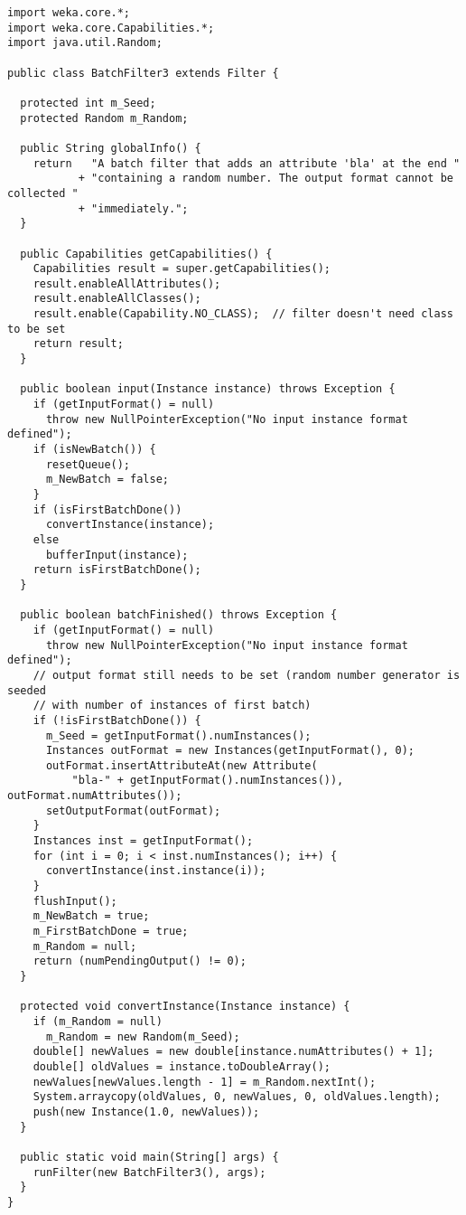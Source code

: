 
\begin{verbatim}
import weka.core.*;
import weka.core.Capabilities.*;
import java.util.Random;

public class BatchFilter3 extends Filter {

  protected int m_Seed;
  protected Random m_Random;

  public String globalInfo() {
    return   "A batch filter that adds an attribute 'bla' at the end "
           + "containing a random number. The output format cannot be collected "
           + "immediately.";
  }

  public Capabilities getCapabilities() {
    Capabilities result = super.getCapabilities();
    result.enableAllAttributes();
    result.enableAllClasses();
    result.enable(Capability.NO_CLASS);  // filter doesn't need class to be set
    return result;
  }

  public boolean input(Instance instance) throws Exception {
    if (getInputFormat() = null)
      throw new NullPointerException("No input instance format defined");
    if (isNewBatch()) {
      resetQueue();
      m_NewBatch = false;
    }
    if (isFirstBatchDone())
      convertInstance(instance);
    else
      bufferInput(instance);
    return isFirstBatchDone();
  }

  public boolean batchFinished() throws Exception {
    if (getInputFormat() = null)
      throw new NullPointerException("No input instance format defined");
    // output format still needs to be set (random number generator is seeded
    // with number of instances of first batch)
    if (!isFirstBatchDone()) {
      m_Seed = getInputFormat().numInstances();
      Instances outFormat = new Instances(getInputFormat(), 0);
      outFormat.insertAttributeAt(new Attribute(
          "bla-" + getInputFormat().numInstances()), outFormat.numAttributes());
      setOutputFormat(outFormat);
    }
    Instances inst = getInputFormat();
    for (int i = 0; i < inst.numInstances(); i++) {
      convertInstance(inst.instance(i));
    }
    flushInput();
    m_NewBatch = true;
    m_FirstBatchDone = true;
    m_Random = null;
    return (numPendingOutput() != 0);
  }

  protected void convertInstance(Instance instance) {
    if (m_Random = null)
      m_Random = new Random(m_Seed);
    double[] newValues = new double[instance.numAttributes() + 1];
    double[] oldValues = instance.toDoubleArray();
    newValues[newValues.length - 1] = m_Random.nextInt();
    System.arraycopy(oldValues, 0, newValues, 0, oldValues.length);
    push(new Instance(1.0, newValues));
  }

  public static void main(String[] args) {
    runFilter(new BatchFilter3(), args);
  }
}
\end{verbatim}

